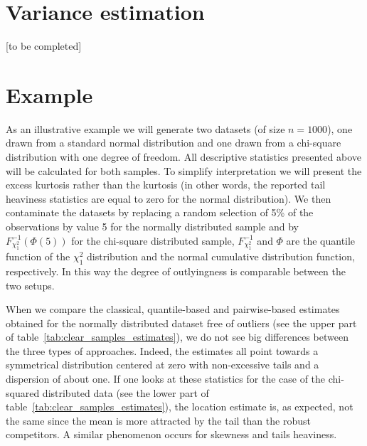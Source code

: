 
\section{Variance estimation}

\alert{[to be completed]}



\section{Example}                                                               

As an illustrative example we will generate two datasets (of size $n = 1000$),
one drawn from a standard normal distribution and one drawn from a chi-square
distribution with one degree of freedom. All descriptive statistics presented
above will be calculated for both samples. To simplify interpretation we will
present the excess kurtosis rather than the kurtosis (in other words, the
reported tail heaviness statistics are equal to zero for the normal
distribution). We then contaminate the datasets by replacing a random selection
of 5\% of the observations by value 5 for the normally distributed sample and
by $F_{\chi_1^2}^{-1}(\Phi(5))$ for the chi-square distributed sample,
$F_{\chi_1^2}^{-1}$ and $\Phi$ are the quantile function of the $\chi_1^2$
distribution and the normal cumulative distribution function, respectively. In
this way the degree of outlyingness is comparable between the two setups.

When we compare the classical, quantile-based and pairwise-based estimates
obtained for the normally distributed dataset free of outliers (see the upper
part of table~\ref{tab:clear_samples_estimates}), we do not see big differences
between the three types of approaches. Indeed, the estimates all point towards
a symmetrical distribution centered at zero with non-excessive tails and a
dispersion of about one. If one looks at these statistics for the case of the
chi-squared distributed data (see the lower part of
table~\ref{tab:clear_samples_estimates}), the location estimate is, as
expected, not the same since the mean is more attracted by the tail than the
robust competitors. A similar phenomenon occurs for skewness and tails
heaviness.

